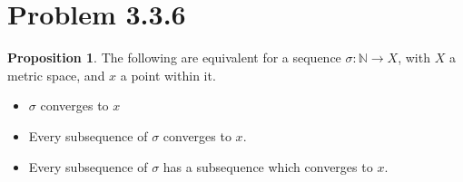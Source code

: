\documentclass[11pt]{article}
\newcommand{\N}{\mathbb{N}}
\theoremstyle{definition}
\newtheorem{proposition}{Proposition}
\begin{document}
\section{Problem 3.3.6}

\begin{proposition}
The following are equivalent for a sequence $\sigma:\N\to X$, with $X$ a metric space, and $x$ a point within it.
\begin{itemize}
\item $\sigma$ converges to $x$
\item Every subsequence of $\sigma$ converges to $x$.
\item Every subsequence of $\sigma$ has a subsequence which converges to $x$.
\end{itemize}
\end{proposition}
\end{document}
